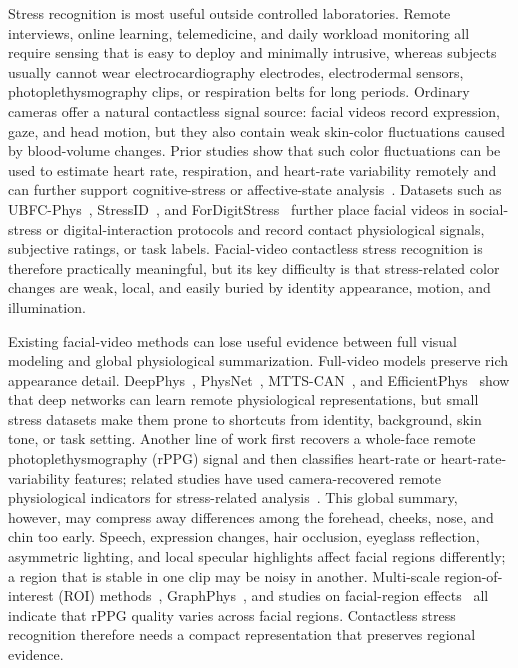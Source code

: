 \documentclass[runningheads]{llncs}
\begin{document}
Stress recognition is most useful outside controlled laboratories. Remote interviews, online learning, telemedicine, and daily workload monitoring all require sensing that is easy to deploy and minimally intrusive, whereas subjects usually cannot wear electrocardiography electrodes, electrodermal sensors, photoplethysmography clips, or respiration belts for long periods. Ordinary cameras offer a natural contactless signal source: facial videos record expression, gaze, and head motion, but they also contain weak skin-color fluctuations caused by blood-volume changes. Prior studies show that such color fluctuations can be used to estimate heart rate, respiration, and heart-rate variability remotely and can further support cognitive-stress or affective-state analysis~\cite{mcduff2014remote,benezeth2018remotehrv,nikolaiev2020noncontact}. Datasets such as UBFC-Phys~\cite{sabour2021ubfcphys}, StressID~\cite{chaptoukaev2023stressid}, and ForDigitStress~\cite{heimerl2024fordigitstress} further place facial videos in social-stress or digital-interaction protocols and record contact physiological signals, subjective ratings, or task labels. Facial-video contactless stress recognition is therefore practically meaningful, but its key difficulty is that stress-related color changes are weak, local, and easily buried by identity appearance, motion, and illumination.

Existing facial-video methods can lose useful evidence between full visual modeling and global physiological summarization. Full-video models preserve rich appearance detail. DeepPhys~\cite{chen2018deepphys}, PhysNet~\cite{yu2019physnet}, MTTS-CAN~\cite{liu2020mttscan}, and EfficientPhys~\cite{liu2023efficientphys} show that deep networks can learn remote physiological representations, but small stress datasets make them prone to shortcuts from identity, background, skin tone, or task setting. Another line of work first recovers a whole-face remote photoplethysmography (rPPG) signal and then classifies heart-rate or heart-rate-variability features; related studies have used camera-recovered remote physiological indicators for stress-related analysis~\cite{mcduff2014remote,nikolaiev2020noncontact}. This global summary, however, may compress away differences among the forehead, cheeks, nose, and chin too early. Speech, expression changes, hair occlusion, eyeglass reflection, asymmetric lighting, and local specular highlights affect facial regions differently; a region that is stable in one clip may be noisy in another. Multi-scale region-of-interest (ROI) methods~\cite{zhao2020multiscale}, GraphPhys~\cite{xiong2023graphphys}, and studies on facial-region effects~\cite{bondarenko2025regions} all indicate that rPPG quality varies across facial regions. Contactless stress recognition therefore needs a compact representation that preserves regional evidence.
\end{document}
